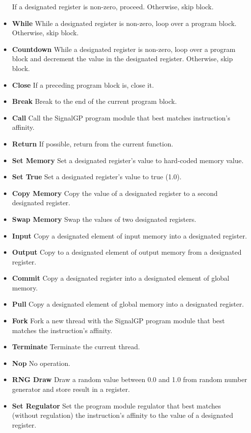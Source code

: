 \begin{itemize}
If a designated register is non-zero, proceed.
Otherwise, skip block.
\item \textbf{While}
While a designated register is non-zero, loop over a program block.
Otherwise, skip block.
\item \textbf{Countdown}
While a designated register is non-zero, loop over a program block and decrement the value in the designated register.
Otherwise, skip block.
\item \textbf{Close}
If a preceding program block is, close it.
\item \textbf{Break}
Break to the end of the current program block.
\item \textbf{Call}
Call the SignalGP program module that best matches instruction's affinity.
\item \textbf{Return}
If possible, return from the current function.
\item \textbf{Set Memory}
Set a designated register's value to hard-coded memory value.
\item \textbf{Set True}
Set a designated register's value to true (1.0).
\item \textbf{Copy Memory}
Copy the value of a designated register to a second designated register.
\item \textbf{Swap Memory}
Swap the values of two designated registers.
\item \textbf{Input}
Copy a designated element of input memory into a designated register.
\item \textbf{Output}
Copy to a designated element of output memory from a designated register.
\item \textbf{Commit}
Copy a designated register into a designated element of global memory.
\item \textbf{Pull}
Copy a designated element of global memory into a designated register.
\item \textbf{Fork}
Fork a new thread with the SignalGP program module that best matches the instruction's affinity.
\item \textbf{Terminate}
Terminate the current thread.
\item \textbf{Nop}
No operation.
\item \textbf{RNG Draw}
Draw a random value between 0.0 and 1.0 from random number generator and store result in a register.
\item \textbf{Set Regulator}
Set the program module regulator that best matches (without regulation) the instruction's affinity to the value of a designated register.

\end{itemize}
